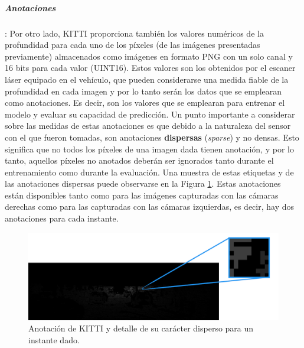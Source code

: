 \subparagraph{Anotaciones}:
Por otro lado, KITTI proporciona también los valores numéricos de la profundidad para cada uno de los píxeles (de las imágenes presentadas previamente) almacenados como imágenes en formato PNG con un solo canal y 16 bits para cada valor (UINT16). Estos valores son los obtenidos por el escaner láser equipado en el vehículo, que pueden considerarse una medida fiable de la profundidad en cada imagen y por lo tanto serán los datos que se emplearan como anotaciones. Es decir, son los valores que se emplearan para entrenar el modelo y evaluar su capacidad de predicción. Un punto importante a considerar sobre las medidas de estas anotaciones es que debido a la naturaleza del sensor con el que fueron tomadas, son anotaciones \textbf{dispersas} (\textit{sparse}) y no densas. Esto significa que no todos los píxeles de una imagen dada tienen anotación, y por lo tanto, aquellos píxeles no anotados deberán ser ignorados tanto durante el entrenamiento como durante la evaluación. Una muestra de estas etiquetas y de las anotaciones dispersas puede observarse en la Figura \ref{fig:kitti_depth}. Estas anotaciones están disponibles tanto como para las imágenes capturadas con las cámaras derechas como para las capturadas con las cámaras izquierdas, es decir, hay dos anotaciones para cada instante.

\begin{figure}[H]
\centering
\includegraphics[width=\textwidth]{imagenes/depth67_img3_detail.png}
\caption{Anotación de KITTI y detalle de su carácter disperso para un instante dado.}
\label{fig:kitti_depth}

\end{figure}


